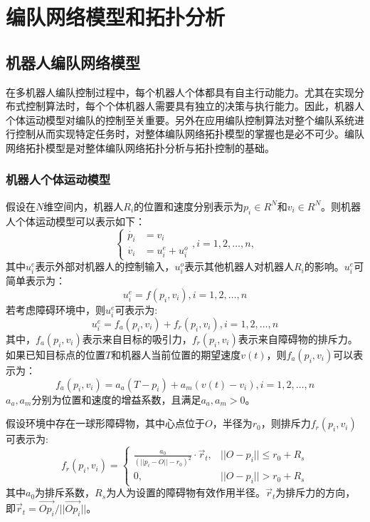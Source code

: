 
\chapter{编队网络模型和拓扑分析}
\label{chap:2}

\section{机器人编队网络模型}
在多机器人编队控制过程中，每个机器人个体都具有自主行动能力。尤其在实现分布式控制算法时，每个个体机器人需要具有独立的决策与执行能力。因此，机器人个体运动模型对编队的控制至关重要。另外在应用编队控制算法对整个编队系统进行控制从而实现特定任务时，对整体编队网络拓扑模型的掌握也是必不可少。编队网络拓扑模型是对整体编队网络拓扑分析与拓扑控制的基础\supercite{张飞2010}。

\subsection{机器人个体运动模型}
假设在$N$维空间内，机器人$R_i$的位置和速度分别表示为$p_i \in R^N$和$v_i \in R^N$。则机器人个体运动模型可以表示如下：
\begin{equation}
	\left\{
	\begin{aligned}
		\dot{p_i} & = v_i \\
		\dot{v_i} & = u_i^e + u_i^o
	\end{aligned}
	, i=1,2,\dots,n,
	\right.
\end{equation}
其中$u_i^e$表示外部对机器人的控制输入，$u_i^o$表示其他机器人对机器人$R_i$的影响。$u_i^e$可简单表示为：
\begin{equation}
	u_i^e = f(p_i,v_i), i=1,2,\dots,n
\end{equation}
若考虑障碍环境中，则$u_i^e$可表示为:
\begin{equation}
	\label{eq:outside_control}
	u_i^e = f_a(p_i,v_i) + f_r(p_i,v_i), i=1,2,\dots,n
\end{equation}
其中，$f_a(p_i,v_i)$表示来自目标的吸引力，$f_r(p_i,v_i)$表示来自障碍物的排斥力。如果已知目标点的位置$T$和机器人当前位置的期望速度$v(t)$，则$f_a(p_i,v_i)$可以表示为：
\begin{equation}
	\label{eq:object_control}
	f_a(p_i,v_i) = a_a(T-p_i) + a_m(v(t)-v_i), i=1,2,\dots,n
\end{equation}
$a_a,a_m$分别为位置和速度的增益系数，且满足$a_a,a_m > 0$。

假设环境中存在一球形障碍物，其中心点位于$O$，半径为$r_0$，则排斥力$f_r(p_i,v_i)$可表示为:
\begin{equation}
	f_r(p_i,v_i) = \begin{cases}
		\frac{a_0}{{(\lvert\lvert p_i-O \rvert\rvert -r_0)}^2} \cdot \vec{r}_t, & \lvert\lvert O-p_i \rvert\rvert \leq r_0 + R_s \\
		0, &  \lvert\lvert O-p_i \rvert\rvert > r_0 + R_s
	\end{cases}
\end{equation}
其中$a_0$为排斥系数，$R_s$为人为设置的障碍物有效作用半径。$\vec{r}_t$为排斥力的方向，即$\vec{r}_t = \vec{Op_i}/\lvert\lvert\vec{Op_i}\rvert\rvert$。
